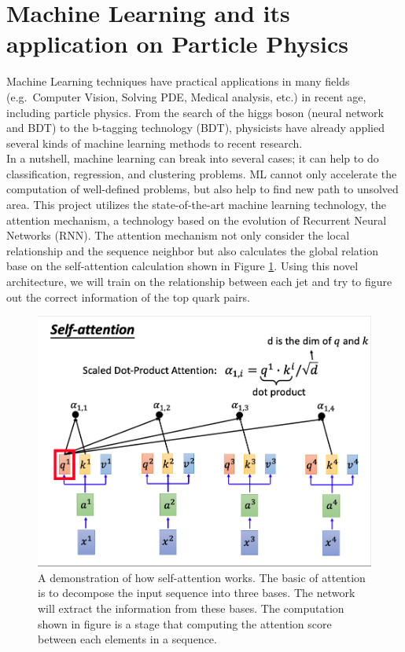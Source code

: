 \section{Machine Learning and its application on Particle Physics}
Machine Learning techniques have practical applications in many fields (e.g.~Computer Vision, Solving PDE, Medical analysis, etc.) in recent age, including particle physics. From the search of the higgs boson (neural network and BDT) to the b-tagging technology (BDT\cite{Paganini:2017dpd}), physicists have already applied several kinds of machine learning methods to recent research.
\\
In a nutshell, machine learning can break into several cases; it can help to do classification, regression, and clustering problems. ML cannot only accelerate the computation of well-defined problems, but also help to find new path to unsolved area. This project utilizes the state-of-the-art machine learning technology, the attention mechanism\cite{A.Vaswani:2017}, a technology based on the evolution of Recurrent Neural Networks (RNN)\cite{A.Vaswani:2017}. The attention mechanism not only consider the local relationship and the sequence neighbor but also calculates the global relation base on the self-attention calculation shown in Figure \ref{fig:attention}. Using this novel architecture, we will train on the relationship between each jet and try to figure out the correct information of the top quark pairs.
\\
\begin{figure}[h]
	\centering
	\includegraphics[width=0.7\linewidth]{Figures/attention.png}
	\caption{A demonstration of how self-attention works\cite{HY.Lee:2019}. The basic of attention is to decompose the input sequence into three bases. The network will extract the information from these bases. The computation shown in figure is a stage that computing the attention score between each elements in a sequence.}
	\label{fig:attention}
\end{figure}
